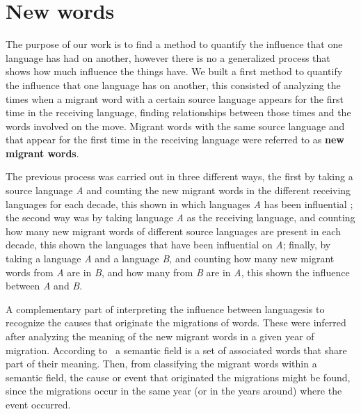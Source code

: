 \documentclass[10pt,letterpaper]{article} %
\begin{document}
\section*{New words} %
The purpose of our work is to find a method to quantify the influence that one
language has had on another, however there is no a generalized process that
shows how much influence the things have. We built a first method to quantify
the influence that one language has on another, this consisted of analyzing the
times when a migrant word with a certain source language appears for the first
time in the receiving language, finding relationships between those times and
the words involved on the move. Migrant words with the same source language and
that appear for the first time in the receiving language were referred to as
\textbf{new migrant words}. 

The previous process was carried out in three different ways, the first by
taking a source language \textit{A} and counting the new migrant words in the
different receiving languages ​​for each decade, this shown in which
languages \textit{A}​ has been influential ; the second way was by taking
language \textit{A} as the receiving language, and counting how many new
migrant words of different source languages are present in each decade, this
shown the languages that have been influential on \textit{A}; finally, by
taking a language \textit{A} and a language \textit{B}, and counting how many
new migrant words from \textit{A} are in \textit{B}, and how many from
\textit{B} are in \textit{A}, this shown the influence between \textit{A} and
\textit{B}.

A complementary part of interpreting the influence between languages
​​is to recognize the causes that originate the migrations of words.
These were inferred after analyzing the meaning of the new migrant words in a
given year of migration. According to~\cite{semantic_oxford} a semantic field is a set
of associated words that share part of their meaning. Then, from classifying
the migrant words within a semantic field, the cause or event that originated
the migrations might be found, since the migrations occur in the same year (or
in the years around) where the event occurred.
\end{document}
